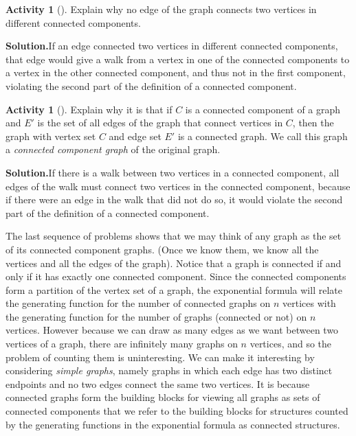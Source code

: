 \documentclass[10pt,]{book}
\theoremstyle{plain}
\theoremstyle{definition}
\newtheorem{activity}[project]{Activity}
\numberwithin{equation}{chapter}
\begin{document}
\begin{activity}[]\label{activity-379}
Explain why no edge of the graph connects two vertices in different connected components.%
\par\medskip\noindent%
\textbf{Solution.}\quad If an edge connected two vertices in different connected components, that edge would give a walk from a vertex in one of the connected components to a vertex in the other connected component, and thus not in the first component, violating the second part of the definition of a connected component.%
\end{activity}
\begin{activity}[]\label{activity-380}
Explain why it is that if \(C\) is a connected component of a graph and \(E'\) is the set of all edges of the graph that connect vertices in \(C\), then the graph with vertex set \(C\) and edge set \(E'\) is a connected graph. We call this graph a \emph{connected component graph} of the original graph.%
\par\medskip\noindent%
\textbf{Solution.}\quad If there is a walk between two vertices in a connected component, all edges of the walk must connect two vertices in the connected component, because if there were an edge in the walk that did not do so, it would violate the second part of the definition of a connected component.%
\end{activity}
The last sequence of problems shows that we may think of any graph as the set of its connected component graphs. (Once we know them, we know all the vertices and all the edges of the graph). Notice that a graph is connected if and only if it has exactly one connected component. Since the connected components form a partition of the vertex set of a graph, the exponential formula will relate the generating function for the number of connected graphs on \(n\) vertices with the generating function for the number of graphs (connected or not) on \(n\) vertices. However because we can draw as many edges as we want between two vertices of a graph, there are infinitely many graphs on \(n\) vertices, and so the problem of counting them is uninteresting. We can make it interesting by considering \emph{simple graphs}, namely graphs in which each edge has two distinct endpoints and no two edges connect the same two vertices. It is because connected graphs form the building blocks for viewing all graphs as sets of connected components that we refer to the building blocks for structures counted by the generating functions in the exponential formula as connected structures.%
\end{document}
